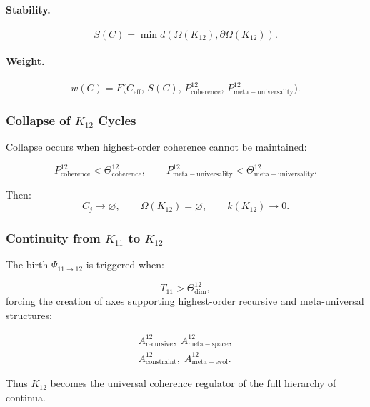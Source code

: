 \paragraph{Stability.}
\[
  S(C)=\min d(\Omega(K_{12}),\partial\Omega(K_{12})).
\]

\paragraph{Weight.}
\[
  w(C) = F\!\big(C_{\mathrm{eff}},\, S(C),\, P^{12}_{\mathrm{coherence}},\,
               P^{12}_{\mathrm{meta\!-\!universality}} \big).
\]


\subsubsection{Collapse of $K_{12}$ Cycles}

Collapse occurs when highest-order coherence cannot be maintained:

\[
  P^{12}_{\mathrm{coherence}}<\Theta^{12}_{\mathrm{coherence}}, \qquad
  P^{12}_{\mathrm{meta\!-\!universality}}<\Theta^{12}_{\mathrm{meta\!-\!universality}}.
\]

Then:
\[
  C_j \to \varnothing,\qquad
  \Omega(K_{12}) = \varnothing,\qquad
  k(K_{12}) \to 0.
\]


\subsubsection{Continuity from $K_{11}$ to $K_{12}$}

The birth $\Psi_{11\to 12}$ is triggered when:

\[
  T_{11}>\Theta^{12}_{\mathrm{dim}},
\]
forcing the creation of axes supporting highest-order recursive and
meta-universal structures:

\[
  \begin{aligned}
  A^{12}_{\mathrm{recursive}},\;
  A^{12}_{\mathrm{meta\!-\!space}},\\
  A^{12}_{\mathrm{constraint}},\;
  A^{12}_{\mathrm{meta\!-\!evol}}.
  \end{aligned}
\]

Thus $K_{12}$ becomes the universal coherence regulator of the full
hierarchy of continua.
